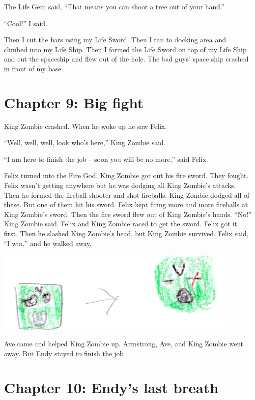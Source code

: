 \documentclass[12pt,oneside]{krantz}
\begin{document}
The Life Gem said, ``That means you can shoot a tree out of your hand.''

``Cool!'' I said.

Then I cut the bars using my Life Sword. Then I ran to docking area and
climbed into my Life Ship. Then I formed the Life Sword on top of my
Life Ship and cut the spaceship and flew out of the hole. The bad guys'
space ship crashed in front of my base.

\hypertarget{chapter-9-big-fight}{%
\chapter*{Chapter 9: Big fight}\label{chapter-9-big-fight}}


King Zombie crashed. When he woke up he saw Felix.

``Well, well, well, look who's here,'' King Zombie said.

``I am here to finish the job -- soon you will be no more,'' said Felix.

Felix turned into the Fire God. King Zombie got out his fire sword. They
fought. Felix wasn't getting anywhere but he was dodging all King
Zombie's attacks. Then he formed the fireball shooter and shot
fireballs. King Zombie dodged all of these. But one of them hit his
sword. Felix kept firing more and more fireballs at King Zombie's sword.
Then the fire sword flew out of King Zombie's hands. ``No!'' King Zombie
said. Felix and King Zombie raced to get the sword. Felix got it first.
Then he slashed King Zombie's head, but King Zombie survived. Felix
said, ``I win,'' and he walked away.

\includegraphics[width=4.6875in,height=\textheight]{img/greenheads.jpg}

Ave came and helped King Zombie up. Armstrong, Ave, and King Zombie went
away. But Endy stayed to finish the job

\hypertarget{chapter-10-endys-last-breath}{%
\chapter*{Chapter 10: Endy's last
breath}\label{chapter-10-endys-last-breath}}
\end{document}
